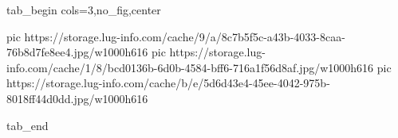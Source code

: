  
 
 
 
 


\ifcmt
  tab_begin cols=3,no_fig,center

     pic https://storage.lug-info.com/cache/9/a/8c7b5f5c-a43b-4033-8caa-76b8d7fe8ee4.jpg/w1000h616
		 pic https://storage.lug-info.com/cache/1/8/bcd0136b-6d0b-4584-bff6-716a1f56d8af.jpg/w1000h616
		 pic https://storage.lug-info.com/cache/b/e/5d6d43e4-45ee-4042-975b-8018ff44d0dd.jpg/w1000h616

  tab_end
\fi
